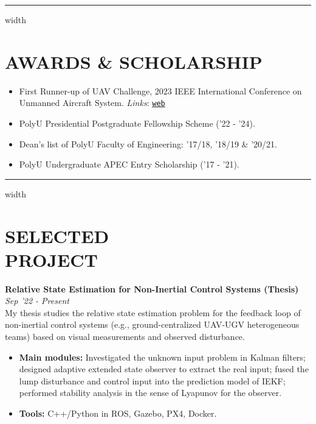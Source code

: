 \documentclass[overlapped]{res}
\newcommand{\pink}[1]{\textcolor{pink!40!red}{#1}} %
\begin{document}
\begin{resume}
\par\noindent\hrule width \linewidth %
\section{AWARDS \& SCHOLARSHIP}
\begin{itemize}
  \item First Runner-up of UAV Challenge, 2023 IEEE International Conference on Unmanned Aircraft System. \textit{Links}: \pink{
    \texttt{\href{https://www.polyu.edu.hk/publications/pulse-polyu/issue/202308/achievements/aae-team-wins-first-runner-up-prize-at-icuas-23-uav-competition}{web}}
  } 
  \item PolyU Presidential Postgraduate Fellowship Scheme ('22 - '24).
  \item Dean’s list of PolyU Faculty of Engineering: '17/18, '18/19 \& '20/21.
  \item PolyU Undergraduate APEC Entry Scholarship ('17 - '21).
\end{itemize}
\par\noindent\hrule width \linewidth %

\section{SELECTED\\PROJECT}

\textbf{Relative State Estimation for Non-Inertial Control Systems (Thesis)}  
\hfill \textit{Sep '22 - Present} \\
My thesis studies the relative state estimation problem for the feedback loop of non-inertial control systems (e.g., ground-centralized UAV-UGV heterogeneous teams) based on visual measurements and observed disturbance. 

\begin{itemize}
  \item \textbf{Main modules:} Investigated the unknown input problem in Kalman filters; designed adaptive extended state observer to extract the real input; fused the lump disturbance and control input into the prediction model of IEKF; performed stability analysis in the sense of Lyapunov for the observer.
  \item \textbf{Tools:} C++/Python in ROS, Gazebo, PX4, Docker.
\end{itemize}


\end{resume}
\end{document}
